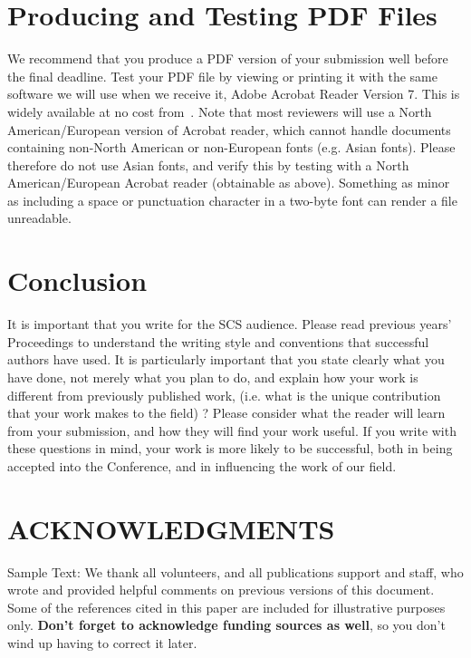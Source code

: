 \documentclass{scsPaperFormattingTemplate-LaTex-Revised20160302}
\begin{document}
\section{Producing and Testing PDF Files}

We recommend that you produce a PDF version of your submission well
before the final deadline.  Test your PDF file by viewing or printing it with the same software we
will use when we receive it, Adobe Acrobat Reader Version 7. This is
widely available at no cost from~\cite{acrobat}.  Note that most
reviewers will use a North American/European version of Acrobat
reader, which cannot handle documents containing non-North American or
non-European fonts (e.g. Asian fonts).  Please therefore do not use
Asian fonts, and verify this by testing with a North American/European
Acrobat reader (obtainable as above). Something as minor as including
a space or punctuation character in a two-byte font can render a file
unreadable.

\balance


\section{Conclusion}

It is important that you write for the SCS audience. Please read previous years’ Proceedings to understand the writing style and conventions that successful authors have used. It is particularly important that you state clearly what you have done, not merely what you plan to do, and explain how your work is different from previously published work, (i.e. what is the unique contribution that your work makes to the field) ? Please consider what the reader will learn from your submission, and how they will find your work useful. If you write with these questions in mind, your work is more likely to be successful, both in being accepted into the Conference, and in influencing the work of our field.


\section*{ACKNOWLEDGMENTS}

Sample Text: We thank all volunteers, and all publications support
and staff, who wrote and provided helpful comments on previous
versions of this document.  Some of the references cited in this paper
are included for illustrative purposes only.  \textbf{Don't forget
to acknowledge funding sources as well}, so you don't wind up
having to correct it later.
\end{document}
